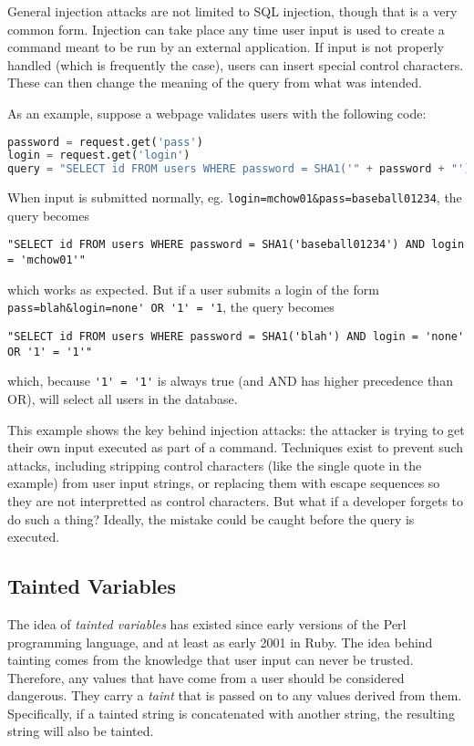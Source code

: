\documentclass[twocolumn]{article}
\begin{document}
General injection attacks are not limited to SQL injection, though that is a very common form.  Injection can take place any time user input is used to create a command meant to be run by an external application.  If input is not properly handled (which is frequently the case), users can insert special control characters.  These can then change the meaning of the query from what was intended.

As an example, suppose a webpage validates users with the following code:
\begin{lstlisting}[language=Python, frame=single]
password = request.get('pass')
login = request.get('login')
query = "SELECT id FROM users WHERE password = SHA1('" + password + "') AND login = '" + login + "'"
\end{lstlisting}

When input is submitted normally, eg. \verb;login=mchow01&pass=baseball01234;, the query becomes
\begin{lstlisting}[frame=single]
"SELECT id FROM users WHERE password = SHA1('baseball01234') AND login = 'mchow01'"
\end{lstlisting}
which works as expected.  But if a user submits a login of the form
\verb;pass=blah&login=none' OR '1' = '1;, the query becomes
\begin{lstlisting}[frame=single]
"SELECT id FROM users WHERE password = SHA1('blah') AND login = 'none' OR '1' = '1'"
\end{lstlisting}
which, because \verb;'1' = '1'; is always true (and AND has higher precedence than OR), will select all users in the database.

This example shows the key behind injection attacks: the attacker is trying to get their own input executed as part of a command.  Techniques exist to prevent such attacks, including stripping control characters (like the single quote in the example) from user input strings, or replacing them with escape sequences so they are not interpretted as control characters.  But what if a developer forgets to do such a thing?  Ideally, the mistake could be caught before the query is executed.

\subsection{Tainted Variables}
The idea of \textit{tainted variables} has existed since early versions of the Perl programming language, and at least as early 2001 in Ruby.\cite{perltaint,rubytaint}  The idea behind tainting comes from the knowledge that user input can never be trusted.  Therefore, any values that have come from a user should be considered dangerous.  They carry a \textit{taint} that is passed on to any values derived from them.  Specifically, if a tainted string is concatenated with another string, the resulting string will also be tainted.\cite{perltaint}
\end{document}
